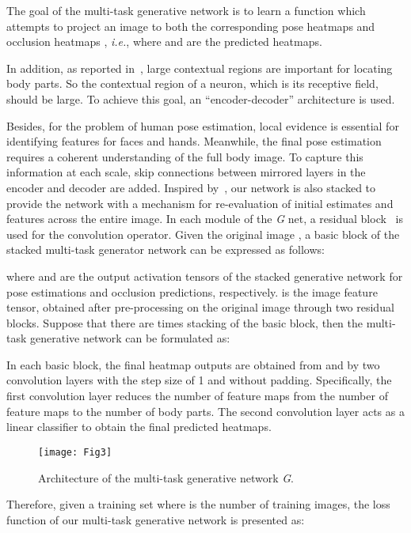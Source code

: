 \documentclass[10pt,letterpaper,twocolumn]{article}
\begin{document}
\def\x{ { \bm x } }

The goal of the multi-task generative network is to learn a function  which attempts to project an image  to both the corresponding pose heatmaps  and occlusion heatmaps , \emph{i.e.},  where  and  are the predicted heatmaps.

In addition, as reported in~\cite{conf/cvpr/WeiRKS16}, large contextual regions are important for locating body parts. So the contextual region of a neuron, which is its receptive field, should be large. To achieve this goal, an ``encoder-decoder'' architecture is used.

Besides, for the problem of human pose estimation, local evidence is essential for identifying features for faces and hands. Meanwhile, the final pose estimation requires a coherent understanding of the full body image. To capture this information at each scale, skip connections between mirrored layers in the encoder and decoder are added. Inspired by~\cite{conf/eccv/NewellYD16}, our network is also stacked to provide the network with a mechanism for re-evaluation of initial estimates and features across the entire image. In each module of the \textit{G} net, a residual block~\cite{conf/cvpr/HeZRS16} is used for the convolution operator. Given the original image , a basic block of the stacked multi-task generator network can be expressed as follows:

where  and  are the output activation tensors of the  stacked generative network for pose estimations and occlusion predictions, respectively.  is the image feature tensor, obtained
after pre-processing on the original image through two residual blocks.
Suppose that there are  times stacking of the basic block, then the multi-task generative network can be formulated as:

In each basic block, the final heatmap outputs  are obtained from  and  by two  convolution layers with the step size of 1 and without padding. Specifically, the first convolution layer reduces the number of feature maps from the number of feature maps to the number of body parts. The second convolution layer acts as a linear classifier to obtain the final predicted heatmaps.

\begin{figure*}[!t]
\centering
\texttt{[image: Fig3]}
\caption{Architecture of the multi-task generative network \textit{G}.}
\label{fig:Architecture-of-G}
\end{figure*}

Therefore, given a training set  where  is the number of training images, the loss function of our multi-task generative network is presented as:
\end{document}

